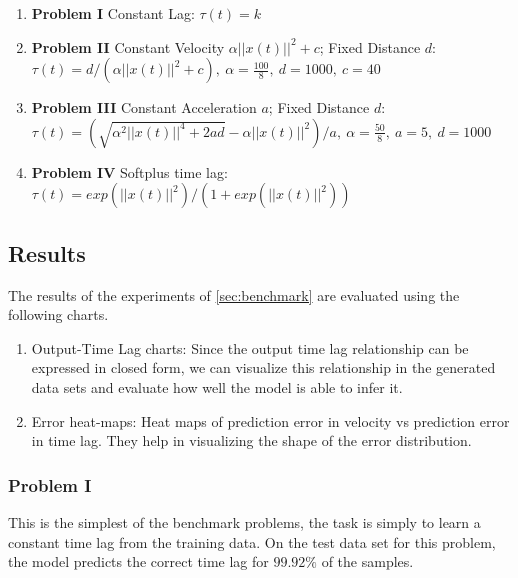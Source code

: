\documentclass[envcountsect,runningheads]{llncs}
\theoremstyle{etoile}
\begin{document}
\begin{enumerate}
\item \textbf{Problem I} Constant Lag: \newline 
$\tau(t) = k$

\item \textbf{Problem II} Constant Velocity $\alpha ||x(t)||^2 + c$; Fixed Distance $d$: 
\newline $\tau(t) = d/(\alpha ||x(t)||^2 + c),\ \alpha = \frac{100}{8},\ d = 1000,\ c = 40$

\item \textbf{Problem III} Constant Acceleration $a$; Fixed Distance $d$: 
\newline $\tau(t) = (\sqrt{\alpha^2||x(t)||^4 + 2ad} - \alpha||x(t)||^2)/a,\ \alpha = \frac{50}{8},\ a = 5,\ d = 1000$

\item \textbf{Problem IV} Softplus time lag: 
\newline $\tau(t) = exp\left(||x(t)||^2\right)/\left(1 + exp(||x(t)||^2)\right)$

\end{enumerate}



\subsection{Results}

The results of the experiments of \ref{sec:benchmark} are evaluated using the following charts.

\begin{enumerate}
    \item Output-Time Lag charts: Since the output time lag relationship can be expressed in closed 
          form, we can visualize this relationship in the generated data sets and evaluate how well 
          the model is able to infer it.
    \item Error heat-maps: Heat maps of prediction error in velocity vs prediction error 
          in time lag. They help in visualizing the shape of the error distribution.
\end{enumerate}


\subsubsection{Problem I}

This is the simplest of the benchmark problems, the task is simply to learn a constant time lag from 
the training data. On the test data set for this problem, the model predicts the correct time lag for 
$99.92\%$ of the samples. 
\end{document}
